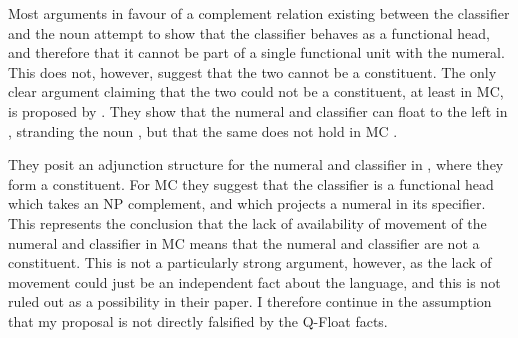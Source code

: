 \documentclass[output=paper
,modfonts
,nonflat]{langsci/langscibook}
\begin{document}
Most arguments in favour of a complement relation existing between the classifier and the noun attempt to show that the classifier behaves as a functional head, and therefore that it cannot be part of a single functional unit with the numeral. This does not, however, suggest that the two cannot be a constituent. The only clear argument claiming that the two could not be a constituent, at least in MC, is proposed by \citet{SaitoEtAlii2008}. They show that the numeral and classifier can float to the left in , stranding the noun , but that the same does not hold in MC . 

\ea \label{ex:hall:38}

\z 
\z 

\ea \label{ex:hall:39}

\z
\z

They posit an adjunction structure for the numeral and classifier in , where they form a constituent. For MC they suggest that the classifier is a functional head which takes an NP complement, and which projects a numeral in its specifier. This represents the conclusion that the lack of availability of movement of the numeral and classifier in MC means that the numeral and classifier are not a constituent. This is not a particularly strong argument, however, as the lack of movement could just be an independent fact about the language, and this is not ruled out as a possibility in their paper. I therefore continue in the assumption that my proposal is not directly falsified by the Q-Float facts.
\end{document}
